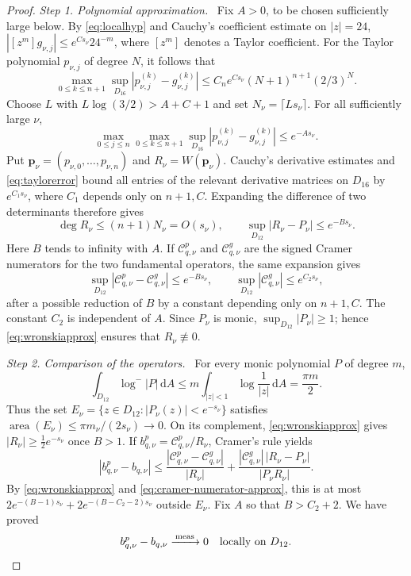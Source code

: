\documentclass[11pt,letterpaper,reqno]{amsart}
\theoremstyle{remark}
\numberwithin{equation}{section}
\newcommand{\dA}{\,\mathrm dA}
\newcommand{\convmeas}{\xrightarrow{\,\mathrm{meas}\,}}
\newcommand{\pv}{\bm p}
\DeclareMathOperator{\area}{area}
\newcommand{\step}[1]{\medskip\noindent\emph{#1}\ }
\begin{document}
\begin{proof}
\step{Step 1. Polynomial approximation.}
Fix $A>0$, to be chosen sufficiently large below.
By \eqref{eq:localhyp} and Cauchy's coefficient estimate on $|z|=24$,
$|[z^m]g_{\nu,j}|\le e^{Cs_\nu}24^{-m}$, where $[z^m]$ denotes a Taylor
coefficient. For the Taylor polynomial $p_{\nu,j}$ of degree $N$, it follows
that
\[
 \max_{0\le k\le n+1}\sup_{D_{16}}
 |p_{\nu,j}^{(k)}-g_{\nu,j}^{(k)}|
 \le C_n e^{Cs_\nu}(N+1)^{n+1}(2/3)^N.
\]
Choose $L$ with $L\log(3/2)>A+C+1$ and set $N_\nu=\lceil Ls_\nu\rceil$.
For all sufficiently large $\nu$,
\begin{equation}\label{eq:taylorerror}
 \max_{0\le j\le n}\max_{0\le k\le n+1}\sup_{D_{16}}
 |p_{\nu,j}^{(k)}-g_{\nu,j}^{(k)}|\le e^{-As_\nu}.
\end{equation}
Put $\pv_\nu=(p_{\nu,0},\ldots,p_{\nu,n})$ and $R_\nu=W(\pv_\nu)$.
Cauchy's derivative estimates and \eqref{eq:taylorerror} bound all entries
of the relevant derivative matrices on $D_{16}$ by $e^{C_1s_\nu}$, where
$C_1$ depends only on $n+1,C$. Expanding the difference of two determinants
therefore gives
\begin{equation}\label{eq:wronskiapprox}
 \deg R_\nu\le (n+1)N_\nu=O(s_\nu),\qquad
 \sup_{D_{12}}|R_\nu-P_\nu|\le e^{-Bs_\nu}.
\end{equation}
Here $B$ tends to infinity with $A$. If $\mathcal C^p_{q,\nu}$ and
$\mathcal C^g_{q,\nu}$ are the signed Cramer numerators for the two
fundamental operators, the same expansion gives
\begin{equation}\label{eq:cramer-numerator-approx}
 \sup_{D_{12}}|\mathcal C^p_{q,\nu}-\mathcal C^g_{q,\nu}|
 \le e^{-Bs_\nu},\qquad
 \sup_{D_{12}}|\mathcal C^g_{q,\nu}|\le e^{C_2s_\nu},
\end{equation}
after a possible reduction of $B$ by a constant depending only on $n+1,C$.
The constant $C_2$ is independent of $A$. Since $P_\nu$ is monic,
$\sup_{D_{12}}|P_\nu|\ge1$; hence \eqref{eq:wronskiapprox} ensures that
$R_\nu\not\equiv0$.

\step{Step 2. Comparison of the operators.}
For every monic polynomial $P$ of degree $m$,
\begin{equation}\label{eq:polynomial-negative-area}
 \int_{D_{12}}\log^-|P|\dA
 \le m\int_{|z|<1}\log\frac1{|z|}\dA=\frac{\pi m}2.
\end{equation}
Thus the set $E_\nu=\{z\in D_{12}:|P_\nu(z)|<e^{-s_\nu}\}$ satisfies
$\area(E_\nu)\le\pi m_\nu/(2s_\nu)\to0$. On its complement,
\eqref{eq:wronskiapprox} gives $|R_\nu|\ge\tfrac12e^{-s_\nu}$ once $B>1$.
If $b^p_{q,\nu}=\mathcal C^p_{q,\nu}/R_\nu$, Cramer's rule yields
\[
 |b^p_{q,\nu}-b_{q,\nu}|
 \le\frac{|\mathcal C^p_{q,\nu}-\mathcal C^g_{q,\nu}|}{|R_\nu|}
 +\frac{|\mathcal C^g_{q,\nu}|\,|R_\nu-P_\nu|}{|P_\nu R_\nu|}.
\]
By \eqref{eq:wronskiapprox} and \eqref{eq:cramer-numerator-approx}, this is
at most $2e^{-(B-1)s_\nu}+2e^{-(B-C_2-2)s_\nu}$ outside $E_\nu$.
Fix $A$ so that $B>C_2+2$. We have proved
\begin{equation}\label{eq:cramercomparison}
 b^p_{q,\nu}-b_{q,\nu}\convmeas0
 \quad\hbox{locally on }D_{12}.
\end{equation}


\end{proof}
\end{document}
